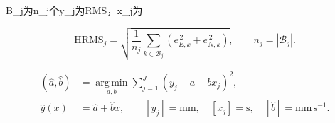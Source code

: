 \documentclass[11pt,a4paper]{article}
\numberwithin{equation}{section}
\numberwithin{figure}{section}
\begin{document}
B\_j{\cjkfont 为}\allowbreak{}n\_j{\cjkfont 个}\allowbreak{}y\_j{\cjkfont 为}\allowbreak{}RMS{\cjkfont ，}\allowbreak{}x\_j{\cjkfont 为}\allowbreak{}

\begin{equation}\mathrm{HRMS}_j=\sqrt{\frac{1}{n_j}\sum_{k\in\mathcal B_j}\left(e_{E,k}^{\,2}+e_{N,k}^{\,2}\right)},\qquad n_j=|\mathcal B_j|.\label{eq:zh-hrms}\end{equation}

\begin{equation}\begin{aligned}(\hat a,\hat b)&=\underset{a,b}{\operatorname{arg\,min}}\sum_{j=1}^{J}(y_j-a-bx_j)^2,\\ \hat y(x)&=\hat a+\hat b x,\qquad [y_j]=\mathrm{mm},\quad [x_j]=\mathrm{s},\quad [\hat b]=\mathrm{mm\,s^{-1}}.\end{aligned}\label{eq:zh-fit}\end{equation}
\end{document}
